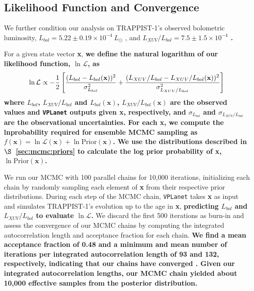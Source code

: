 \documentclass[twocolumn]{aastex62}
\newcommand{\xxx}[1]{{\textbf{#1}}}
\newcommand{\vplanet}[0]{\texttt{VPLanet}\xspace}
\begin{document}
\subsection{Likelihood Function and Convergence} \label{sec:mcmc:like}

We further condition our analysis on TRAPPIST-1's observed bolometric luminosity, $L_{bol} = 5.22 \pm{0.19} \times 10^{-4} \ L_{\odot}$ \citep[][but see also \citet{Gonzales2019}]{vanGrootel2018}, and \xxx{$L_{XUV}/L_{bol} = 7.5 \pm{1.5} \times 10^{-4}$ \citep{Wheatley2017}.} 

For a given state vector \textbf{x}, \xxx{we define the natural logarithm of our likelihood function, $\ln \mathcal{L}$, as}
\small
\begin{equation} \label{eqn:lnlike}
    \ln \mathcal{L} \propto -\frac{1}{2} \left[ \frac{(L_{bol} - L_{bol}(\textbf{x}))^2}{\sigma_{L_{bol}}^2} + \frac{(L_{XUV}/L_{bol} - L_{XUV}/L_{bol}(\textbf{x}))^2}{\sigma_{L_{XUV}/L_{bol}}^2} \right] \\
\end{equation}
\normalsize
\xxx{where $L_{bol}$, $L_{XUV}/L_{bol}$ and $L_{bol}(\textbf{x})$, $L_{XUV}/L_{bol}(\textbf{x})$ are the observed values and \vplanet outputs given \textbf{x}, respectively, and $\sigma_{L_{bol}}$ and $\sigma_{L_{XUV}/L_{bol}}$ are the observational uncertainties. For each \textbf{x}, we compute the lnprobability required for ensemble MCMC sampling as $f(\textbf{x}) = \ln \mathcal{L}(\textbf{x}) + \ln \mathrm{Prior}(\textbf{x})$. We use the distributions described in $\S$~\ref{sec:mcmc:priors} to calculate the log prior probability of \textbf{x}, $\ln \mathrm{Prior}(\textbf{x})$.} 

We run our MCMC with 100 parallel chains for 10,000 iterations, initializing each chain by randomly sampling each element of \textbf{x} from their respective prior distributions. During each step of the MCMC chain, \vplanet takes \textbf{x} as input and simulates TRAPPIST-1's evolution up to the age in \textbf{x}, \xxx{predicting $L_{bol}$ and $L_{XUV}/L_{bol}$ to evaluate $\ln \mathcal{L}$.} We discard the first 500 iterations as burn-in and assess the convergence of our MCMC chains by computing the integrated autocorrelation length and acceptance fraction for each chain. \xxx{We find a mean acceptance fraction of 0.48 and a minimum and mean number of iterations per integrated autocorrelation length of 93 and 132, respectively, indicating that our chains have converged \citep{ForemanMackey2013}. Given our integrated autocorrelation lengths, our MCMC chain yielded about 10,000 effective samples from the posterior distribution.}
\end{document}
